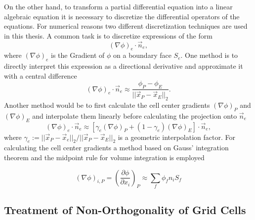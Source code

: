 On the other hand, to transform a partial differential equation into a linear algebraic equation it is necessary to discretize the differential operators of the equations. For numerical reasons two different discretization techniques are used in this thesis. A common task is to discretize expressions of the form
\begin{displaymath}
  \left(\nabla \phi\right)_e \cdot \vec{n}_e,
\end{displaymath}
where \(\left(\nabla \phi\right)_e\) is the Gradient of \(\phi\) on a boundary face \(S_e\). One method is to directly interpret this expression as a directional derivative and approximate it with a central difference
\begin{equation}
  \label{eq:cds}
  \left(\nabla \phi\right)_e \cdot \vec{n}_e \approx \frac{\phi_P - \phi_E}{|| \vec{x}_P - \vec{x}_E ||_2}.
\end{equation}
Another method would be to first calculate the cell center gradients \(\left(\nabla \phi \right)_P\) and \(\left(\nabla \phi \right)_E\) and interpolate them linearly before calculating the projection onto \(\vec{n}_e\)
\begin{equation}
  \label{eq:interpolgrad}
  \left(\nabla \phi\right)_e \cdot \vec{n}_e 
  \approx 
  \left[\gamma_e \left(\nabla \phi \right)_P + (1-\gamma_e) \left(\nabla \phi \right)_E \right] \cdot \vec{n}_e,
\end{equation}
where \( \gamma_e := {||\vec{x}_P - \vec{x}_e||_2}/{||\vec{x}_P - \vec{x}_E||_2}\) is a geometric interpolation factor. For calculating the cell center gradients a method based on Gauss' integration theorem and the midpoint rule for volume integration is employed

\begin{equation}
  \label{eq:gaussgrad}
  \left( \nabla \phi \right)_{i,P}
  =
  \left( \frac{\partial \phi}{\partial x_i}\right)_P
  \approx
  \sum_f \phi_f n_i S_f
\end{equation}

\subsection{Treatment of Non-Orthogonality of Grid Cells}
\label{sec:nonorth}

